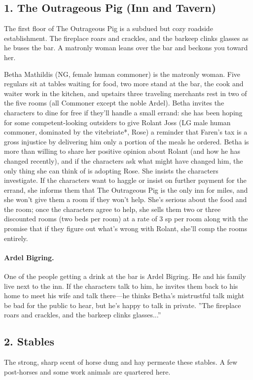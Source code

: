 \documentclass[10pt,a4paper,twoside,twocolumn,openany,bg=print,nodeprecatedcode]{dndbook}
\begin{document}
\subsection{1. The Outrageous Pig (Inn and Tavern)}
\begin{DndReadAloud}{}
The first floor of The Outrageous Pig is a subdued but cozy roadside establishment. The fireplace roars and crackles, and the barkeep clinks glasses as he buses the bar. A matronly woman leans over the bar and beckons you toward her.
\end{DndReadAloud}

Betha Mathildis (NG, female human commoner) is the matronly woman. Five regulars sit at tables waiting for food, two more stand at the bar, the cook and waiter work in the kitchen, and upstairs three traveling merchants rest in two of the five rooms (all Commoner except the noble Ardel).
Betha invites the characters to dine for free if they'll handle a small errand: she has been hoping for some competent-looking outsiders to give Rolant Joss (LG male human commoner, dominated by the vitebriate*, Rose) a reminder that Faren's tax is a gross injustice by delivering him only a portion of the meals he ordered. Betha is more than willing to share her positive opinion about Rolant (and how he has changed recently), and if the characters ask what might have changed him, the only thing she can think of is adopting Rose. She insists the characters investigate. If the characters want to haggle or insist on further payment for the errand, she informs them that The Outrageous Pig is the only inn for miles, and she won't give them a room if they won't help.
She's serious about the food and the room; once the characters agree to help, she sells them two or three discounted rooms (two beds per room) at a rate of 3 sp per room along with the promise that if they figure out what's wrong with Rolant, she'll comp the rooms entirely.
\paragraph{Ardel Bigring.}
One of the people getting a drink at the bar is Ardel Bigring. He and his family live next to the inn. If the characters talk to him, he invites them back to his home to meet his wife and talk there—he thinks Betha's mistrustful talk might be bad for the public to hear, but he's happy to talk in private.
\DndQuote%
{}
{''The fireplace roars and crackles, and the barkeep clinks glasses...''}
{}
\subsection{2. Stables}
\begin{DndReadAloud}{}
The strong, sharp scent of horse dung and hay permeate these stables. A few post-horses and some work animals are quartered here.
\end{DndReadAloud}
\end{document}
